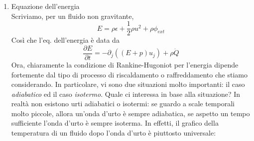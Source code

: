 \documentclass{report}
\begin{document}
\begin{enumerate}
    In realtà, abbiamo solo considerato l'eq. di Eulero diretta lungo l'asse $x$, a l'eq. di eulero è vettoriale, quindi ci può dare informazioni su le componenti $y, z$ di $u_1, u_2$. In particolare, si ha 
    \begin{equation}
        \partial_t(\rho u_i) = -\partial_j(\rho u_i u_j + p\delta_{ij})
    \end{equation}
    Con gli stessi conti trovati prima, si ottiene, lungo un qualunque versore $\hat{n}$: 
    \begin{equation}
        n_i(\rho u_iu_j +p\delta_{ij})|^2_1 =0
    \end{equation}

    Se prendiamo $i=j$ allora troviamo l'espressione precedente, se invece prendiamo $i\neq j$ allora abbiamo due possibilità:

    \begin{align}
        & \rho u_xu_y |^2_1 = 0 \\
        & \rho u_x u_z |^2_1 = 0 
    \end{align}

    Ricordando però che $\rho u_x$ si conserva per la prima condizione di Rankine-Hugoniot, otteniamo semplicemente che 
    \begin{align}
        &u_{y, 1} = u_{y, 2} \\ &u_{z, 1} = u_{z, 2}
    \end{align}

    \item Equazione dell'energia \\
    Scriviamo, per un fluido non gravitante, 
    \begin{equation}
        E = \rho \epsilon + \frac{1}{2}\rho u^2 + \rho \phi_{ext}
    \end{equation}
    Così che l'eq. dell'energia è data da 
    \begin{equation}
        \frac{\partial E}{\partial t} = -\partial_j((E+p)u_j) + \rho\dot{Q}
    \end{equation}
    Ora, chiaramente la condizione di Rankine-Hugoniot per l'energia dipende fortemente dal tipo di processo di riscaldamento o raffreddamento che stiamo considerando. In particolare, vi sono due situazioni molto importanti: il caso \emph{adiabatico} ed il caso \emph{isotermo}. Quale ci interessa in base alla situazione? In realtà non esistono urti adiabatici o isotermi: se guardo a scale temporali molto piccole, allora un'onda d'urto è sempre adiabatica, se aspetto un tempo sufficiente l'onda d'urto è sempre isoterma. In effetti, il grafico della temperatura di un fluido dopo l'onda d'urto è piuttosto universale: \\


\end{enumerate}
\end{document}
